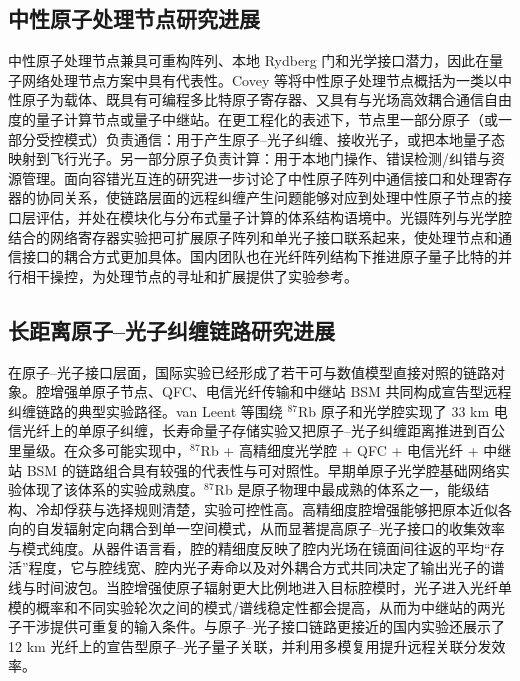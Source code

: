 \subsection{中性原子处理节点研究进展}

中性原子处理节点兼具可重构阵列、本地 Rydberg 门和光学接口潜力，因此在量子网络处理节点方案中具有代表性\cite{Covey2023QuantumNetworksNeutralAtomNodes,Sinclair2024FaultTolerantOpticalInterconnectsNeutralAtoms}。Covey 等将中性原子处理节点概括为一类以中性原子为载体、既具有可编程多比特原子寄存器、又具有与光场高效耦合通信自由度的量子计算节点或量子中继站\cite{Covey2023QuantumNetworksNeutralAtomNodes}。在更工程化的表述下，节点里一部分原子（或一部分受控模式）负责通信：用于产生原子--光子纠缠、接收光子，或把本地量子态映射到飞行光子。另一部分原子负责计算：用于本地门操作、错误检测/纠错与资源管理。面向容错光互连的研究进一步讨论了中性原子阵列中通信接口和处理寄存器的协同关系，使链路层面的远程纠缠产生问题能够对应到处理中性原子节点的接口层评估，并处在模块化与分布式量子计算的体系结构语境中\cite{Monroe2014ModularQC,Covey2023QuantumNetworksNeutralAtomNodes,Sinclair2024FaultTolerantOpticalInterconnectsNeutralAtoms}。光镊阵列与光学腔结合的网络寄存器实验把可扩展原子阵列和单光子接口联系起来，使处理节点和通信接口的耦合方式更加具体\cite{Hartung2024QuantumNetworkRegisterTweezerCavity}。国内团队也在光纤阵列结构下推进原子量子比特的并行相干操控，为处理节点的寻址和扩展提供了实验参考\cite{Li2025FiberArrayArchitectureAtomQC}。

\subsection{长距离原子--光子纠缠链路研究进展}

在原子--光子接口层面，国际实验已经形成了若干可与数值模型直接对照的链路对象。腔增强单原子节点、QFC、电信光纤传输和中继站 BSM 共同构成宣告型远程纠缠链路的典型实验路径\cite{Reiserer2022CavityEnhancedNetworkNodes,vanleent2020longdistance,vanleent2022entangling}。van Leent 等围绕 $^{87}$Rb 原子和光学腔实现了 33 km 电信光纤上的单原子纠缠，长寿命量子存储实验又把原子--光子纠缠距离推进到百公里量级\cite{vanleent2022entangling,zhou2024longlived}。在众多可能实现中，$^{87}$Rb + 高精细度光学腔 + QFC + 电信光纤 + 中继站 BSM 的链路组合具有较强的代表性与可对照性\cite{vanleent2020longdistance,vanleent2022entangling,Reiserer2022CavityEnhancedNetworkNodes}。早期单原子光学腔基础网络实验体现了该体系的实验成熟度。$^{87}$Rb 是原子物理中最成熟的体系之一，能级结构、冷却俘获与选择规则清楚，实验可控性高\cite{Ritter2012ElementaryQuantumNetwork}。高精细度腔增强能够把原本近似各向的自发辐射定向耦合到单一空间模式，从而显著提高原子--光子接口的收集效率与模式纯度\cite{Reiserer2022CavityEnhancedNetworkNodes,Hartung2024QuantumNetworkRegisterTweezerCavity}。从器件语言看，腔的精细度反映了腔内光场在镜面间往返的平均“存活”程度，它与腔线宽、腔内光子寿命以及对外耦合方式共同决定了输出光子的谱线与时间波包\cite{Reiserer2022CavityEnhancedNetworkNodes}。当腔增强使原子辐射更大比例地进入目标腔模时，光子进入光纤单模的概率和不同实验轮次之间的模式/谱线稳定性都会提高，从而为中继站的两光子干涉提供可重复的输入条件\cite{Reiserer2022CavityEnhancedNetworkNodes,vanleent2022entangling}。与原子--光子接口链路更接近的国内实验还展示了 12 km 光纤上的宣告型原子--光子量子关联，并利用多模复用提升远程关联分发效率\cite{Zhang2024HeraldedAtomPhoton12km}。


